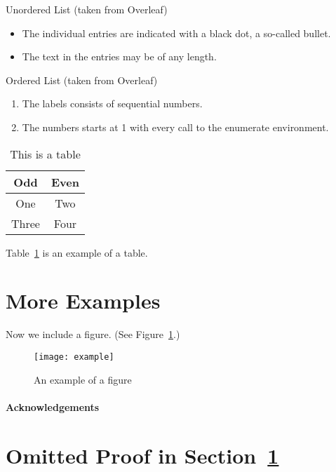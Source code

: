 \documentclass[a4paper]{article}
\theoremstyle{plain}
\theoremstyle{definition}
\begin{document}
	Unordered List (taken from Overleaf)
	\begin{itemize}
		\item The individual entries are indicated with a black dot, a so-called bullet.
		\item The text in the entries may be of any length.
	\end{itemize}

	Ordered List (taken from Overleaf)
	\begin{enumerate}
		\item The labels consists of sequential numbers.
		\item The numbers starts at 1 with every call to the enumerate environment.
	\end{enumerate}

	\begin{table}[ht]
		\centering
		\begin{tabular}{|c|c|}
			\hline
			\textbf{Odd} & \textbf{Even} \\
			\hline\hline
			One & Two \\
			\hline
			Three & Four \\
			\hline
		\end{tabular}
		\caption{This is a table}
		\label{tbl:1}
	\end{table}

	Table~\ref*{tbl:1} is an example of a table.
	
	\section{More Examples}
	\label{sec:examples}
	
	Now we include a figure.
	(See Figure~\ref{fig:example}.)
	\begin{figure}[ht]
		\centering
		\texttt{[image: example]}
		\caption{An example of a figure}
		\label{fig:example}
	\end{figure}
	
	\paragraph{Acknowledgements} \lipsum[6]
	
	
	
	\appendix
	
	\section{Omitted Proof in Section~\ref{sec:examples}}
	\label{app:1}
	
	\lipsum[7]
	
\end{document}
